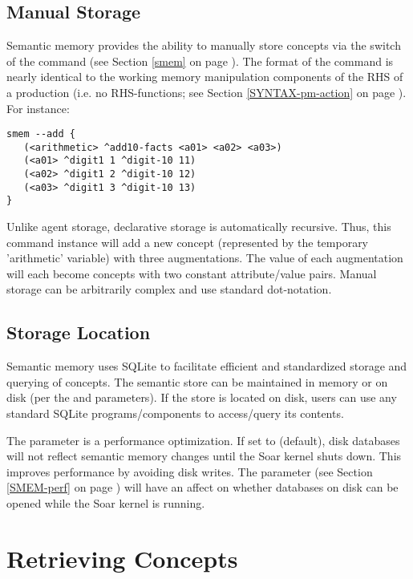 \subsection{Manual Storage}
Semantic memory provides the ability to manually store concepts via the  switch of the  command (see Section \ref{smem} on page \pageref{smem}).  The format of the command is nearly identical to the working memory manipulation components of the RHS of a production (i.e. no RHS-functions; see Section \ref{SYNTAX-pm-action} on page \pageref{SYNTAX-pm-action}).  For instance:

\begin{verbatim}
smem --add {
   (<arithmetic> ^add10-facts <a01> <a02> <a03>)
   (<a01> ^digit1 1 ^digit-10 11)
   (<a02> ^digit1 2 ^digit-10 12)
   (<a03> ^digit1 3 ^digit-10 13)
}
\end{verbatim}

Unlike agent storage, declarative storage is automatically recursive.  Thus, this command instance will add a new concept (represented by the temporary 'arithmetic' variable) with three augmentations.  The value of each augmentation will each become concepts with two constant attribute/value pairs.  Manual storage can be arbitrarily complex and use standard dot-notation.

\subsection{Storage Location}
Semantic memory uses SQLite to facilitate efficient and standardized storage and querying of concepts.  The semantic store can be maintained in memory or on disk (per the  and  parameters).  If the store is located on disk, users can use any standard SQLite programs/components to access/query its contents. 

The  parameter is a performance optimization.  If set to  (default), disk databases will not reflect semantic memory changes until the Soar kernel shuts down. This improves performance by avoiding disk writes. The  parameter (see Section \ref{SMEM-perf} on page \pageref{SMEM-perf}) will have an affect on whether databases on disk can be opened while the Soar kernel is running.


\section{Retrieving Concepts}
\label{SMEM-retrieve}

